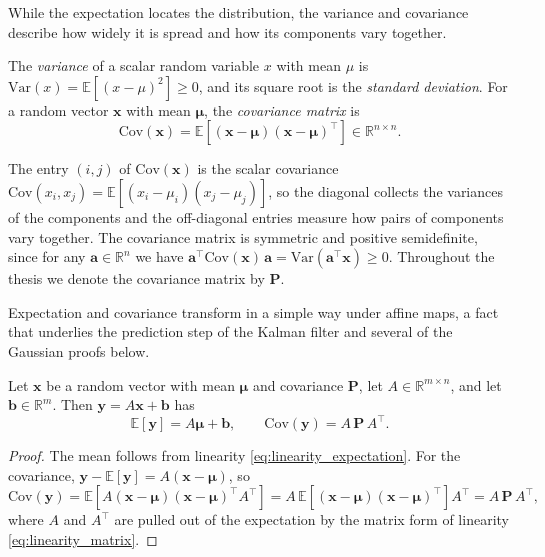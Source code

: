 While the expectation locates the distribution, the variance and covariance describe how widely it is spread and how its components vary together.

\begin{definition}\label{def:covariance}
The \emph{variance} of a scalar random variable $x$ with mean $\mu$ is $\mathrm{Var}(x) = \mathbb{E}[(x - \mu)^2] \ge 0$, and its square root is the \emph{standard deviation}. For a random vector $\mathbf{x}$ with mean $\boldsymbol{\mu}$, the \emph{covariance matrix} is
\begin{equation}\label{eq:cov_matrix}
    \mathrm{Cov}(\mathbf{x}) = \mathbb{E}\!\left[(\mathbf{x} - \boldsymbol{\mu})(\mathbf{x} - \boldsymbol{\mu})^\top\right] \in \mathbb{R}^{n \times n}.
\end{equation}
\end{definition}

The entry $(i,j)$ of $\mathrm{Cov}(\mathbf{x})$ is the scalar covariance $\mathrm{Cov}(x_i, x_j) = \mathbb{E}[(x_i - \mu_i)(x_j - \mu_j)]$, so the diagonal collects the variances of the components and the off-diagonal entries measure how pairs of components vary together. The covariance matrix is symmetric and positive semidefinite, since for any $\mathbf{a} \in \mathbb{R}^n$ we have $\mathbf{a}^\top \mathrm{Cov}(\mathbf{x})\, \mathbf{a} = \mathrm{Var}(\mathbf{a}^\top \mathbf{x}) \ge 0$. Throughout the thesis we denote the covariance matrix by $\mathbf{P}$.

Expectation and covariance transform in a simple way under affine maps, a fact that underlies the prediction step of the Kalman filter and several of the Gaussian proofs below.

\begin{proposition}\label{prop:affine_moments}
Let $\mathbf{x}$ be a random vector with mean $\boldsymbol{\mu}$ and covariance $\mathbf{P}$, let $A \in \mathbb{R}^{m \times n}$, and let $\mathbf{b} \in \mathbb{R}^m$. Then $\mathbf{y} = A\mathbf{x} + \mathbf{b}$ has
\begin{equation}\label{eq:affine_moments}
    \mathbb{E}[\mathbf{y}] = A\boldsymbol{\mu} + \mathbf{b}, \qquad
    \mathrm{Cov}(\mathbf{y}) = A\,\mathbf{P}\,A^\top.
\end{equation}
\end{proposition}

\begin{proof}
The mean follows from linearity \eqref{eq:linearity_expectation}. For the covariance, $\mathbf{y} - \mathbb{E}[\mathbf{y}] = A(\mathbf{x} - \boldsymbol{\mu})$, so
\[
    \mathrm{Cov}(\mathbf{y}) = \mathbb{E}\!\left[A(\mathbf{x} - \boldsymbol{\mu})(\mathbf{x} - \boldsymbol{\mu})^\top A^\top\right]
    = A\,\mathbb{E}\!\left[(\mathbf{x} - \boldsymbol{\mu})(\mathbf{x} - \boldsymbol{\mu})^\top\right] A^\top
    = A\,\mathbf{P}\,A^\top,
\]
where $A$ and $A^\top$ are pulled out of the expectation by the matrix form of linearity \eqref{eq:linearity_matrix}.
\end{proof}

